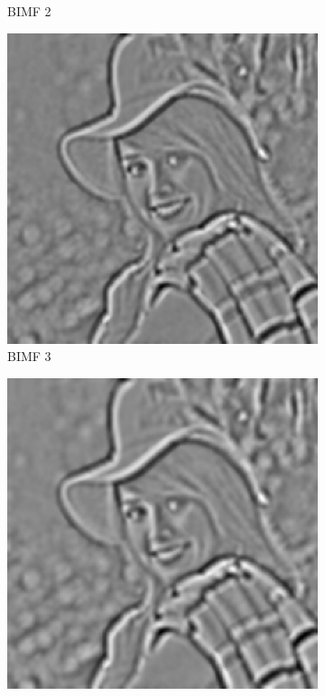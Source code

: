 \begin{figure}
\begin{subfigure}{.30\textwidth}
  \caption{BIMF 2}
\end{subfigure}
\begin{subfigure}{.30\textwidth}
  \centering
  \includegraphics[width=.9\linewidth]{img/e_1_1_3}
  \caption{BIMF 3}
\end{subfigure}
\begin{subfigure}{.30\textwidth}
  \centering
  \includegraphics[width=.9\linewidth]{img/e_1_1_4}

\end{subfigure}
\end{figure}
